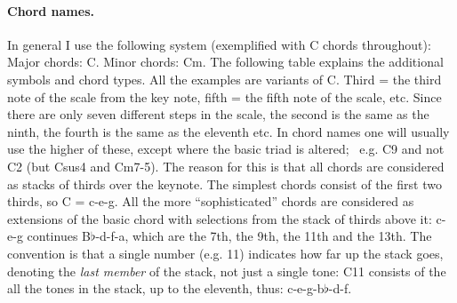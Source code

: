 \begin{articlelayout}
\paragraph*{Chord names.} In general I use the following system
(exemplified with C chords throughout): Major chords: C. Minor chords:
Cm. The following table explains the additional symbols and chord
types. All the examples are variants of C. Third = the third note of
the scale from the key note, fifth = the fifth note of the scale,
etc. Since there are only seven different steps in the scale, the
second is the same as the ninth, the fourth is the same as the
eleventh etc. In chord names one will usually use the higher of these,
except where the basic triad is altered;~ e.g. C9 and not C2 (but
Csus4 and Cm7-5). The reason for this is that all chords are considered as stacks of thirds over the keynote. The simplest chords consist of the first two thirds, so C = c-e-g. All the more ``{}sophisticated''{}
chords are considered as extensions of the basic chord with selections
from the stack of thirds above it: c-e-g continues B$\flat$-d-f-a,
which are the 7th, the 9th, the 11th and the 13th. The convention is
that a single number (e.g. 11) indicates how far up the stack goes,
denoting the \emph{last member} of the
stack, not just a single tone: C11 consists of the all
the tones in the stack, up to the eleventh, thus: c-e-g-b$\flat$-d-f.


\newcommand{\chordexpl}[3]{\vspace{1ex}{\noindent
    \setbox0\hbox{\Huge #1~~}%
    \count0=\ht0                   %
    \count1=\baselineskip          %
    \divide\count0 by \count1      %
    \dimen1 = \count0\baselineskip %
    \advance\count0 by 1\relax     %
    \dimen0=\wd0                   %
    \global\hangindent\dimen0      %
    \global\hangafter-\count0      %
    \hskip-\dimen0\setbox0\hbox to\dimen0{\raise-\dimen1\box0\hss}%
    \dp0=0in\ht0=0in\box0}%
    \textit{#2}\\#3\par\nobreak%
}


\end{articlelayout}
